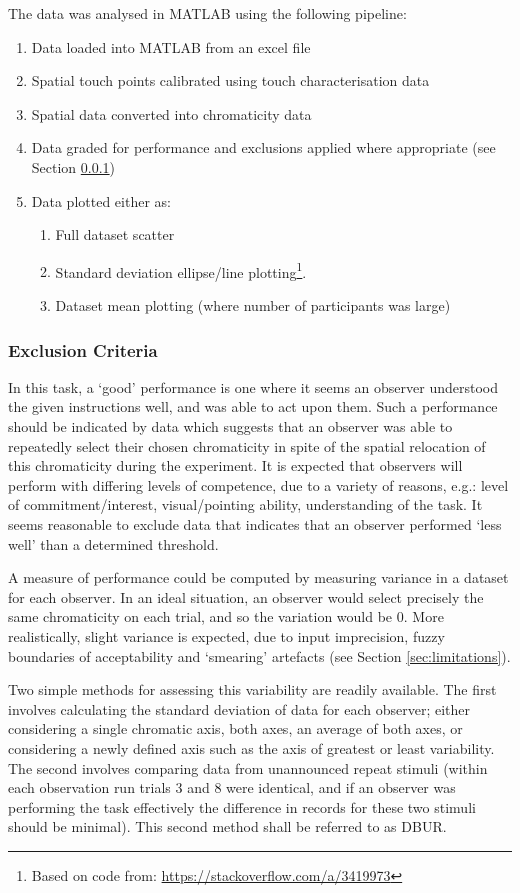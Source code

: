 The data was analysed in \gls{MATLAB} using the following pipeline:
\begin{enumerate}
\item Data loaded into \gls{MATLAB} from an excel file
\item Spatial touch points calibrated using touch characterisation data
\item Spatial data converted into chromaticity data
\item Data graded for performance and exclusions applied where appropriate (see Section \ref{sec:exclusion}) 
\item Data plotted either as:
\begin{enumerate}
\item Full dataset scatter
\item Standard deviation ellipse/line plotting\footnote{Based on code from: \url{https://stackoverflow.com/a/3419973}}.
\item Dataset mean plotting (where number of participants was large)
\end{enumerate}
\end{enumerate}

\subsubsection{Exclusion Criteria} \label{sec:exclusion}

In this task, a `good' performance is one where it seems an observer understood the given instructions well, and was able to act upon them. Such a performance should be indicated by data which suggests that an observer was able to repeatedly select their chosen chromaticity in spite of the spatial relocation of this chromaticity during the experiment. It is expected that observers will perform with differing levels of competence, due to a variety of reasons, e.g.: level of commitment/interest, visual/pointing ability, understanding of the task. It seems reasonable to exclude data that indicates that an observer performed `less well' than a determined threshold.

A measure of performance could be computed by measuring variance in a dataset for each observer. In an ideal situation, an observer would select precisely the same chromaticity on each trial, and so the variation would be 0. More realistically, slight variance is expected, due to input imprecision, fuzzy boundaries of acceptability and `smearing' artefacts (see Section \ref{sec:limitations}).

Two simple methods for assessing this variability are readily available. The first involves calculating the standard deviation of data for each observer; either considering a single chromatic axis, both axes, an average of both axes, or considering a newly defined axis such as the axis of greatest or least variability. The second involves comparing data from unannounced repeat stimuli (within each observation run trials 3 and 8 were identical, and if an observer was performing the task effectively the difference in records for these two stimuli should be minimal). This second method shall be referred to as \acrfull{DBUR}.

